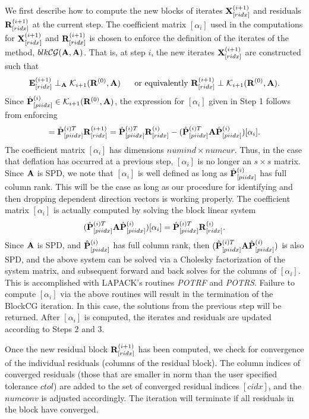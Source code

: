 \documentclass{article}
\newcommand{\bA}{{\bf A}}
\newcommand{\bE}{{\bf E}}
\newcommand{\bP}{{\bf P}}
\newcommand{\bR}{{\bf R}}
\newcommand{\bX}{{\bf X}}
\newcommand{\dm}{\begin{displaymath}}
\newcommand{\edm}{\end{displaymath}}
\begin{document}
We first describe how to compute the new blocks of iterates
$\bX^{(i+1)}_{[ridx]}$ and residuals $\bR^{(i+1)}_{[ridx]}$ at the
current step. The coefficient matrix $[\alpha_i]$ used in the
computations for $\bX^{(i+1)}_{[ridx]}$ and $\bR^{(i+1)}_{[ridx]}$
is chosen to enforce the definition of the iterates of the method,
$blk{\cal CG}(\bA, \bA)$. That is, at step $i$, the new iterates
$\bX^{(i+1)}_{[ridx]}$ are constructed such that
 \dm
  \bE_{[ridx]}^{(i+1)}  \perp_{\bA}  {\cal K}_{i+1} (\bR^{(0)}, \bA) \\
  ~~~~~{\rm or~equivalently}~~ \\
  \bR_{[ridx]}^{(i+1)}  \perp  {\cal K}_{i+1} (\bR^{(0)}, \bA).
  \edm
Since ${\hat \bP}^{(i)}_{[piidx]} \in {\cal K}_{i+1}(\bR^{(0)},
\bA)$, the expression for $[\alpha_i]$ given in Step 1 follows
from enforcing
 \dm
 [ {\bf 0} ] = {\hat \bP}^{(i)T}_{[piidx]} \bR^{(i+1)}_{[ridx]} =
   {\hat \bP}^{(i)T}_{[piidx]} \bR^{(i)}_{[ridx]}
 - ( {\hat \bP}^{(i)T}_{[piidx]} \bA {\hat \bP}^{(i)}_{[piidx]})
 [ \alpha_i ].
 \edm
The coefficient matrix $[\alpha_i]$ has dimensions $numind \times
numcur$. Thus, in the case that deflation has occurred at a
previous step, $[\alpha_i]$ is no longer an $s \times s$ matrix.
Since $\bA$ is SPD, we note that $[\alpha_i]$ is well defined as
long as ${\hat \bP}^{(i)}_{[piidx]}$ has full column rank. This
will be the case as long as our procedure for identifying and then
dropping dependent direction vectors is working properly. The
coefficient matrix $[\alpha_i]$ is actually computed by solving
the block linear system
 \dm
 ( {\hat \bP}^{(i)T}_{[piidx]} \bA {\hat \bP}^{(i)}_{[piidx]})
 [ \alpha_i ] = {\hat \bP}^{(i)T}_{[piidx]} \bR^{(i)}_{[ridx]}.
 \edm
Since $\bA$ is SPD, and ${\hat \bP}^{(i)}_{[piidx]}$ has full
column rank, then $( {\hat \bP}^{(i)T}_{[piidx]} \bA {\hat
\bP}^{(i)}_{[piidx]})$ is also SPD, and the above system can be
solved via a Cholesky factorization of the system matrix, and
subsequent forward and back solves for the columns of
$[\alpha_i]$. This is accomplished with LAPACK's routines {\it
POTRF} and {\it POTRS}. Failure to compute $[\alpha_i]$ via the
above routines will result in the termination of the BlockCG
iteration. In this case, the solutions from the previous step will
be returned. After $[\alpha_i]$ is computed, the iterates and
residuals are updated according to Steps 2 and 3.

Once the new residual block $\bR^{(i+1)}_{[ridx]}$ has been
computed, we check for convergence of the individual residuals
(columns of the residual block). The column indices of converged
residuals (those that are smaller in norm than the user specified
tolerance $ctol$) are added to the set of converged residual
indices $[cidx]$, and the $numconv$ is adjusted accordingly. The
iteration will terminate if all residuals in the block have
converged.
\end{document}
